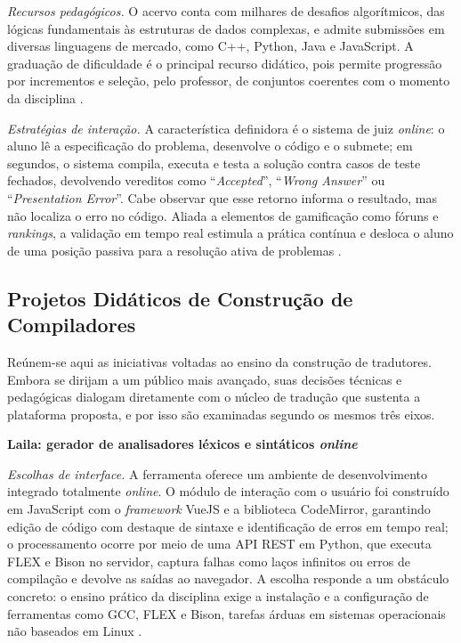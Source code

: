 \textit{Recursos pedagógicos.} O acervo conta com milhares de desafios algorítmicos, das lógicas fundamentais às estruturas de dados complexas, e admite submissões em diversas linguagens de mercado, como C++, Python, Java e JavaScript. A graduação de dificuldade é o principal recurso didático, pois permite progressão por incrementos e seleção, pelo professor, de conjuntos coerentes com o momento da disciplina \cite{garcia2024,ferreira2025}.

\textit{Estratégias de interação.} A característica definidora é o sistema de juiz \textit{online}: o aluno lê a especificação do problema, desenvolve o código e o submete; em segundos, o sistema compila, executa e testa a solução contra casos de teste fechados, devolvendo vereditos como ``\textit{Accepted}'', ``\textit{Wrong Answer}'' ou ``\textit{Presentation Error}''. Cabe observar que esse retorno informa o resultado, mas não localiza o erro no código. Aliada a elementos de gamificação como fóruns e \textit{rankings}, a validação em tempo real estimula a prática contínua e desloca o aluno de uma posição passiva para a resolução ativa de problemas \cite{ferreira2025,maonocodigo2022}.

\subsection{Projetos Didáticos de Construção de Compiladores}

Reúnem-se aqui as iniciativas voltadas ao ensino da construção de tradutores. Embora se dirijam a um público mais avançado, suas decisões técnicas e pedagógicas dialogam diretamente com o núcleo de tradução que sustenta a plataforma proposta, e por isso são examinadas segundo os mesmos três eixos.

\noindent\textbf{Laila: gerador de analisadores léxicos e sintáticos \textit{online}}

\textit{Escolhas de interface.} A ferramenta oferece um ambiente de desenvolvimento integrado totalmente \textit{online}. O módulo de interação com o usuário foi construído em JavaScript com o \textit{framework} VueJS e a biblioteca CodeMirror, garantindo edição de código com destaque de sintaxe e identificação de erros em tempo real; o processamento ocorre por meio de uma API REST em Python, que executa FLEX e Bison no servidor, captura falhas como laços infinitos ou erros de compilação e devolve as saídas ao navegador. A escolha responde a um obstáculo concreto: o ensino prático da disciplina exige a instalação e a configuração de ferramentas como GCC, FLEX e Bison, tarefas árduas em sistemas operacionais não baseados em Linux \cite{ladgelson2021}.


